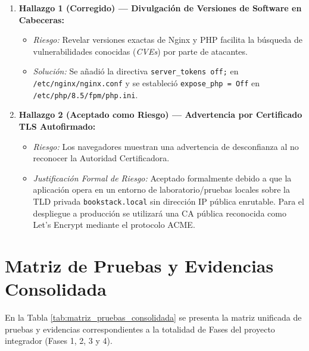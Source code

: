 \documentclass[12pt,a4paper]{article}
\begin{document}
\begin{enumerate}
    \item \textbf{Hallazgo 1 (Corregido) --- Divulgación de Versiones de Software en Cabeceras:}
    \begin{itemize}
        \item \textit{Riesgo:} Revelar versiones exactas de Nginx y PHP facilita la búsqueda de vulnerabilidades conocidas (\textit{CVEs}) por parte de atacantes.
        \item \textit{Solución:} Se añadió la directiva \texttt{server\_tokens off;} en \texttt{/etc/nginx/nginx.conf} y se estableció \texttt{expose\_php = Off} en \texttt{/etc/php/8.5/fpm/php.ini}.
    \end{itemize}
    \item \textbf{Hallazgo 2 (Aceptado como Riesgo) --- Advertencia por Certificado TLS Autofirmado:}
    \begin{itemize}
        \item \textit{Riesgo:} Los navegadores muestran una advertencia de desconfianza al no reconocer la Autoridad Certificadora.
        \item \textit{Justificación Formal de Riesgo:} Aceptado formalmente debido a que la aplicación opera en un entorno de laboratorio/pruebas locales sobre la TLD privada \texttt{bookstack.local} sin dirección IP pública enrutable. Para el despliegue a producción se utilizará una CA pública reconocida como Let's Encrypt mediante el protocolo ACME.
    \end{itemize}
\end{enumerate}

\newpage
\section{Matriz de Pruebas y Evidencias Consolidada}

En la Tabla \ref{tab:matriz_pruebas_consolidada} se presenta la matriz unificada de pruebas y evidencias correspondientes a la totalidad de Fases del proyecto integrador (Fases 1, 2, 3 y 4).
\end{document}
